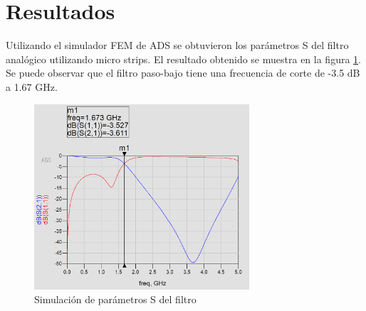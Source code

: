 \section{Resultados}

Utilizando el simulador FEM de ADS se obtuvieron los parámetros S del filtro analógico utilizando micro strips. El resultado obtenido se muestra en la figura     \ref{fig:resultado_parametros_s}. Se puede observar que el filtro paso-bajo tiene una frecuencia de corte de -3.5 dB a 1.67 GHz.

\begin{figure}[!ht]
    \centering
    \includegraphics[width=8cm]{figures/resultado.png}
    \caption{Simulación de parámetros S del filtro}
    \label{fig:resultado_parametros_s}
\end{figure}
